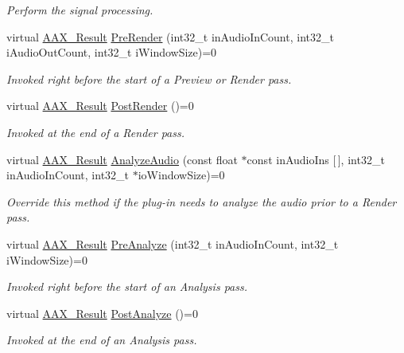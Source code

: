 \begin{DoxyCompactItemize}
\begin{DoxyCompactList}\small\item\em Perform the signal processing. \end{DoxyCompactList}\item 
virtual \mbox{\hyperlink{a00392_a4d8f69a697df7f70c3a8e9b8ee130d2f}{A\+A\+X\+\_\+\+Result}} \mbox{\hyperlink{a01693_aac48c69e51b81cc59c7b6807c1c7f9ed}{Pre\+Render}} (int32\+\_\+t in\+Audio\+In\+Count, int32\+\_\+t i\+Audio\+Out\+Count, int32\+\_\+t i\+Window\+Size)=0
\begin{DoxyCompactList}\small\item\em Invoked right before the start of a Preview or Render pass. \end{DoxyCompactList}\item 
virtual \mbox{\hyperlink{a00392_a4d8f69a697df7f70c3a8e9b8ee130d2f}{A\+A\+X\+\_\+\+Result}} \mbox{\hyperlink{a01693_afafcab62ae4b4174a9f81350bba2da9f}{Post\+Render}} ()=0
\begin{DoxyCompactList}\small\item\em Invoked at the end of a Render pass. \end{DoxyCompactList}\item 
virtual \mbox{\hyperlink{a00392_a4d8f69a697df7f70c3a8e9b8ee130d2f}{A\+A\+X\+\_\+\+Result}} \mbox{\hyperlink{a01693_a227c87038b0939728a78d7da7fdb05bb}{Analyze\+Audio}} (const float $\ast$const in\+Audio\+Ins \mbox{[}$\,$\mbox{]}, int32\+\_\+t in\+Audio\+In\+Count, int32\+\_\+t $\ast$io\+Window\+Size)=0
\begin{DoxyCompactList}\small\item\em Override this method if the plug-\/in needs to analyze the audio prior to a Render pass. \end{DoxyCompactList}\item 
virtual \mbox{\hyperlink{a00392_a4d8f69a697df7f70c3a8e9b8ee130d2f}{A\+A\+X\+\_\+\+Result}} \mbox{\hyperlink{a01693_a7d816bdb7b3b683aa2245a179d61d70e}{Pre\+Analyze}} (int32\+\_\+t in\+Audio\+In\+Count, int32\+\_\+t i\+Window\+Size)=0
\begin{DoxyCompactList}\small\item\em Invoked right before the start of an Analysis pass. \end{DoxyCompactList}\item 
virtual \mbox{\hyperlink{a00392_a4d8f69a697df7f70c3a8e9b8ee130d2f}{A\+A\+X\+\_\+\+Result}} \mbox{\hyperlink{a01693_a3b42c24c578987ab8dc6127ccc7d15b3}{Post\+Analyze}} ()=0
\begin{DoxyCompactList}\small\item\em Invoked at the end of an Analysis pass. \end{DoxyCompactList}\end{DoxyCompactItemize}


